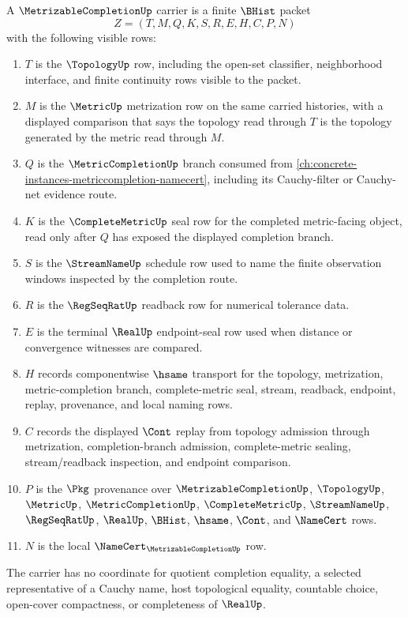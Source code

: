 \begin{definition}
\label{def:metrizable-completion-carrier}
A $\MetrizableCompletionUp$ carrier is a finite $\BHist$ packet
$$
Z=(T,M,Q,K,S,R,E,H,C,P,N)
$$
with the following visible rows:
\begin{enumerate}
\item $T$ is the $\TopologyUp$ row, including the open-set classifier, neighborhood interface, and finite continuity rows visible to the packet.
\item $M$ is the $\MetricUp$ metrization row on the same carried histories, with a displayed comparison that says the topology read through $T$ is the topology generated by the metric read through $M$.
\item $Q$ is the $\MetricCompletionUp$ branch consumed from \autoref{ch:concrete-instances-metriccompletion-namecert}, including its Cauchy-filter or Cauchy-net evidence route.
\item $K$ is the $\CompleteMetricUp$ seal row for the completed metric-facing object, read only after $Q$ has exposed the displayed completion branch.
\item $S$ is the $\StreamNameUp$ schedule row used to name the finite observation windows inspected by the completion route.
\item $R$ is the $\RegSeqRatUp$ readback row for numerical tolerance data.
\item $E$ is the terminal $\RealUp$ endpoint-seal row used when distance or convergence witnesses are compared.
\item $H$ records componentwise $\hsame$ transport for the topology, metrization, metric-completion branch, complete-metric seal, stream, readback, endpoint, replay, provenance, and local naming rows.
\item $C$ records the displayed $\Cont$ replay from topology admission through metrization, completion-branch admission, complete-metric sealing, stream/readback inspection, and endpoint comparison.
\item $P$ is the $\Pkg$ provenance over $\MetrizableCompletionUp$, $\TopologyUp$, $\MetricUp$, $\MetricCompletionUp$, $\CompleteMetricUp$, $\StreamNameUp$, $\RegSeqRatUp$, $\RealUp$, $\BHist$, $\hsame$, $\Cont$, and $\NameCert$ rows.
\item $N$ is the local $\NameCert_{\MetrizableCompletionUp}$ row.
\end{enumerate}
The carrier has no coordinate for quotient completion equality, a selected representative of a Cauchy name, host topological equality, countable choice, open-cover compactness, or completeness of $\RealUp$.
\end{definition}

